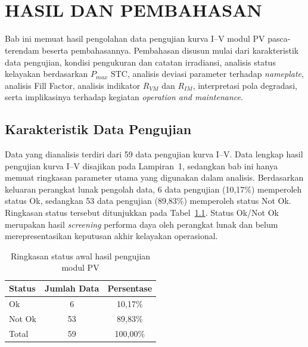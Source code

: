 
\chapter[HASIL DAN PEMBAHASAN]{\\ HASIL DAN PEMBAHASAN}

Bab ini memuat hasil pengolahan data pengujian kurva I--V modul PV
pasca-terendam beserta pembahasannya. Pembahasan disusun mulai dari
karakteristik data pengujian, kondisi pengukuran dan catatan irradiansi,
analisis status kelayakan berdasarkan $P_{max}$ STC, analisis deviasi parameter
terhadap \textit{nameplate}, analisis Fill Factor, analisis indikator $R_{VM}$
dan $R_{IM}$, interpretasi pola degradasi, serta implikasinya terhadap kegiatan
\textit{operation and maintenance}.

\section{Karakteristik Data Pengujian}

Data yang dianalisis terdiri dari 59 data pengujian kurva I--V. Data lengkap
hasil pengujian kurva I--V disajikan pada Lampiran~1, sedangkan bab ini hanya
memuat ringkasan parameter utama yang digunakan dalam analisis. Berdasarkan
keluaran perangkat lunak pengolah data, 6 data pengujian (10,17\%) memperoleh
status Ok, sedangkan 53 data pengujian (89,83\%) memperoleh status Not Ok.
Ringkasan status tersebut ditunjukkan pada Tabel~\ref{tab:status_pengujian}.
Status Ok/Not Ok merupakan hasil \textit{screening} performa daya oleh
perangkat lunak dan belum merepresentasikan keputusan akhir kelayakan
operasional.

\begin{table}[H]
\caption{Ringkasan status awal hasil pengujian modul PV}
\label{tab:status_pengujian}
\centering
\begin{tabular}{lcc}
\toprule
\textbf{Status} & \textbf{Jumlah Data} & \textbf{Persentase} \\
\midrule
Ok      & 6  & 10,17\%  \\
Not Ok  & 53 & 89,83\%  \\
\midrule
Total   & 59 & 100,00\% \\
\bottomrule
\end{tabular}
\end{table}

